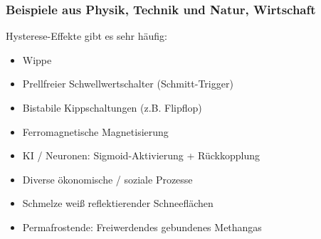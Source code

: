 \documentclass{beamer}
\begin{document}
\begin{frame}
  \frametitle{Beispiele aus Physik, Technik und Natur, Wirtschaft}
  Hysterese-Effekte gibt es sehr häufig:
  \begin{itemize}
    \item<2->  Wippe
    \item<3->  Prellfreier Schwellwertschalter (Schmitt-Trigger)
    \item<4->  Bistabile Kippschaltungen (z.B. Flipflop)
    \item<5->  Ferromagnetische Magnetisierung
    \item<6->  KI / Neuronen: Sigmoid-Aktivierung + Rückkopplung
    \item<7->  Diverse ökonomische / soziale Prozesse
    \item<8->  Schmelze weiß reflektierender Schneeflächen
    \item<9->  Permafrostende: Freiwerdendes gebundenes Methangas
  \end{itemize}
\end{frame}

\end{document}

